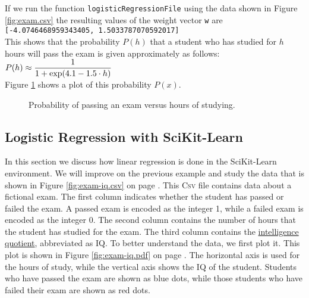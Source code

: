 If we run the function \texttt{logisticRegressionFile} using the data shown in Figure
\ref{fig:exam.csv} the resulting values of the weight vector \texttt{w} are
\\[0.2cm]
\hspace*{1.3cm}
\texttt{[-4.0746468959343405, 1.5033787070592017]}
\\[0.2cm]
This shows that the probability $P(h)$ that a student who has studied for $h$ hours will pass the
exam is given approximately as follows:
\\[0.2cm]
\hspace*{1.3cm}
$\displaystyle P(h) \approx \frac{1}{1 + \exp(4.1 - 1.5 \cdot h)}$
\\[0.2cm]
Figure \ref{fig:exam-probability.pdf} shows a plot of this probability $P(x)$.  

\begin{figure}[!th]
\caption{Probability of passing an exam versus hours of studying.}
\label{fig:exam-probability.pdf}
\end{figure}
\FloatBarrier

\subsection{Logistic Regression with SciKit-Learn}
In this section we discuss how linear regression is done in the SciKit-Learn environment.
We will improve on the previous example and study the data that is shown in Figure \ref{fig:exam-iq.csv} on
page \pageref{fig:exam-iq.csv}.
This \textsc{Csv} file contains data about a fictional exam.  The first column indicates whether the student
has passed or failed the exam.  A passed exam is encoded as the integer 1, while a failed exam is encoded as the integer 0.
The second column contains the number of hours that the student has studied for the exam.  The third column
contains the \href{https://en.wikipedia.org/wiki/Intelligence_quotient}{intelligence quotient}, abbreviated as
IQ.  To better understand the data, we first plot it.  This plot is shown in Figure \ref{fig:exam-iq.pdf} on
page \pageref{fig:exam-iq.pdf}.  The horizontal axis is used for the hours of study, while the vertical axis
shows the IQ of the student.  Students who have passed the exam are shown as blue dots, while those students
who have failed their exam are shown as red dots.

